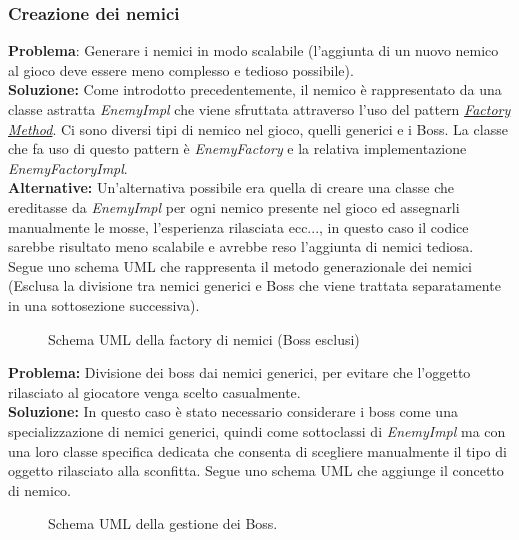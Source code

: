 \documentclass[a4paper,12pt]{report}
\begin{document}
\subsubsection{Creazione dei nemici}
\textbf{Problema}: Generare i nemici in modo scalabile (l'aggiunta di un nuovo nemico al gioco deve essere meno complesso e tedioso possibile).\\
\textbf{Soluzione:} Come introdotto precedentemente, il nemico è rappresentato da una classe astratta \textit{EnemyImpl} che viene sfruttata attraverso l'uso del pattern \href{https://refactoring.guru/design-patterns/factory-method}{\textit{Factory Method}}.
Ci sono diversi tipi di nemico nel gioco, quelli generici e i Boss. La classe che fa uso di questo pattern è \textit{EnemyFactory} e la relativa implementazione \textit{EnemyFactoryImpl}.\\ \textbf{Alternative:} Un'alternativa possibile era quella di creare una classe che ereditasse da \textit{EnemyImpl} per ogni nemico presente nel gioco ed assegnarli manualmente le mosse, l'esperienza rilasciata ecc..., in questo caso il codice sarebbe risultato meno scalabile e avrebbe reso l'aggiunta di nemici tediosa.\\
Segue uno schema UML che rappresenta il metodo generazionale dei nemici (Esclusa la divisione tra nemici generici e Boss che viene trattata separatamente in una sottosezione successiva).\\

\begin{figure}[H]
	\centering
	
	\caption{Schema UML della factory di nemici (Boss esclusi)}
	\label{fig:Schema UML della factory di nemici}
\end{figure}

\textbf{Problema:} Divisione dei boss dai nemici generici, per evitare che l'oggetto rilasciato al giocatore venga scelto casualmente.\\
\textbf{Soluzione:} In questo caso è stato necessario considerare i boss come una specializzazione di nemici generici, quindi come sottoclassi di \textit{EnemyImpl} ma con una loro classe specifica dedicata che consenta di scegliere manualmente il tipo di oggetto rilasciato alla sconfitta. Segue uno schema UML che aggiunge il concetto di nemico.\\

\begin{figure}[H]
	\centering
	
	\caption{Schema UML della gestione dei Boss.}
	\label{fig:Schema UML della gestione dei boss.}
\end{figure}
\end{document}
